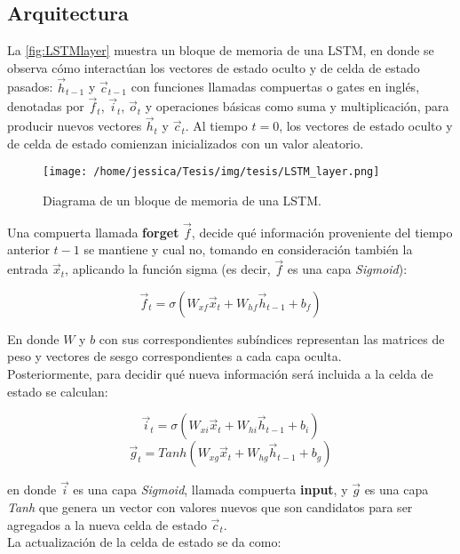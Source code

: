 \subsection{Arquitectura}\label{sec:LSTM_Arch}
La \autoref{fig:LSTMlayer} muestra un bloque de memoria de una \acs{LSTM}, en donde se observa cómo interactúan los vectores de estado oculto y de celda de estado pasados: $\vec{h}_{t-1}$ y $\vec{c}_{t-1}$ con funciones llamadas compuertas o gates en inglés, denotadas por $\vec{f}_t$, $\vec{i}_t$, $\vec{o}_t$ y operaciones básicas como suma y multiplicación, para producir nuevos vectores $\vec{h}_{t}$ y $\vec{c}_{t}$. Al tiempo $t=0$, los vectores de estado oculto y de celda de estado comienzan inicializados con un valor aleatorio. \cite{Olah}

\begin{figure}[!htbp]
  \centering
  \texttt{[image: /home/jessica/Tesis/img/tesis/LSTM\_layer.png]}
  \caption{Diagrama de un bloque de memoria de una \acs{LSTM}.}
  \label{fig:LSTMlayer}
\end{figure}

Una compuerta llamada \textbf{forget} $\vec{f}$, decide qué información proveniente del tiempo anterior $t-1$ se mantiene y cual no, tomando en consideración también la entrada $\vec{x}_t$, aplicando la función sigma (es decir, $\vec{f}$ es una capa \emph{Sigmoid}):

\begin{equation}\label{eq:ft}
\vec{f}_t = \sigma(W_{xf}\vec{x}_t + W_{hf}\vec{h}_{t-1} + b_f)
\end{equation}

En donde $W$ y $b$ con sus correspondientes subíndices representan las matrices de peso y vectores de sesgo correspondientes a cada capa oculta. \\
Posteriormente, para decidir qué nueva información será incluida a la celda de estado se calculan:

\begin{equation}\label{eq:it}
\vec{i}_t = \sigma(W_{xi}\vec{x}_t + W_{hi}\vec{h}_{t-1} + b_i)
\end{equation}
\begin{equation}
  \label{eq:gt}
\vec{g}_t = Tanh(W_{xg}\vec{x}_t + W_{hg}\vec{h}_{t-1} + b_g)  
\end{equation}

en donde $\vec{i}$ es una capa \emph{Sigmoid}, llamada compuerta \textbf{input}, y $\vec{g}$ es una capa \emph{Tanh} que genera un vector con valores nuevos que son candidatos para ser agregados a la nueva celda de estado $\vec{c}_t$.
\\
La actualización de la celda de estado se da como:

